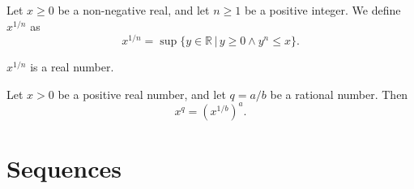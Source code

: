 \documentclass{article}
\begin{document}
\begin{definition}[\(n\)th root]
	Let \(x\geq 0\) be a non-negative real, and let \(n\geq 1\) be a positive integer. We define \(x^{1/n}\) as
	\begin{equation*}
		x^{1/n}=\sup\{y\in\mathbb{R}\,|\,y\geq 0\wedge y^n\leq x\}.
	\end{equation*}
\end{definition}
\begin{lemma}
	\(x^{1/n}\) is a real number.
\end{lemma}
\begin{definition}
	Let \(x>0\) be a positive real number, and let \(q=a/b\) be a rational number. Then
	\begin{equation*}
		x^q=(x^{1/b})^a.
	\end{equation*}
\end{definition}
\section{Sequences}
\end{document}
